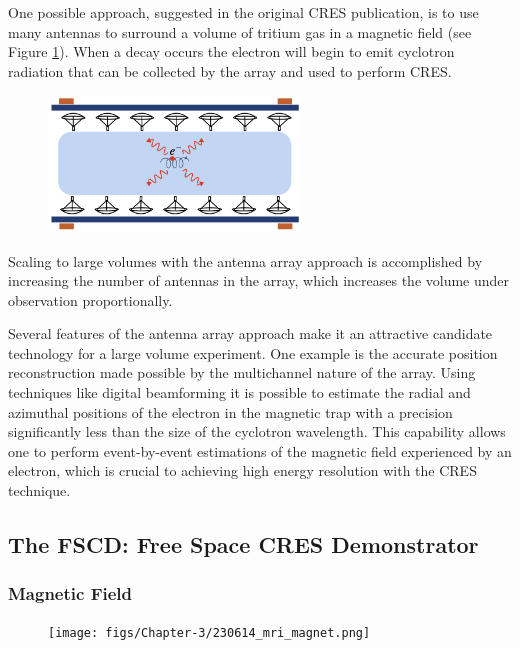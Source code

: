 One possible approach, suggested in the original CRES publication, is to use many antennas to surround a volume of tritium gas in a magnetic field (see Figure \ref{fig:chap3-antenna-concept-cartoon}). When a decay occurs the electron will begin to emit cyclotron radiation that can be collected by the array and used to perform CRES. 
\begin{figure}[htbp]
    \centering
    \includegraphics*[width=0.6\textwidth]{figs/Chapter-3/230614_antenna_cartoon.png}
    \caption{\label{fig:chap3-antenna-concept-cartoon}}
\end{figure}
Scaling to large volumes with the antenna array approach is accomplished by increasing the number of antennas in the array, which increases the volume under observation proportionally. 

Several features of the antenna array approach make it an attractive candidate technology for a large volume experiment. One example is the accurate position reconstruction made possible by the multichannel nature of the array. Using techniques like digital beamforming it is possible to estimate the radial and azimuthal positions of the electron in the magnetic trap with a precision significantly less than the size of the cyclotron wavelength. This capability allows one to perform event-by-event estimations of the magnetic field experienced by an electron, which is crucial to achieving high energy resolution with the CRES technique. 




\subsection{The FSCD: Free Space CRES Demonstrator}

\subsubsection*{Magnetic Field}

\begin{figure}[htbp]
    \centering
    \texttt{[image: figs/Chapter-3/230614\_mri\_magnet.png]}
    \caption{}
\end{figure}

